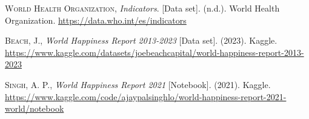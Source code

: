 \documentclass[fleqn,11pt]{article}
\begin{document}
\begin{thebibliography}{10}
 \textsc{World Health Organization}, \textit{Indicators}. [Data set]. (n.d.). World Health Organization. \newline
\small{\url{https://data.who.int/es/indicators}}

 \textsc{Beach, J.}, \textit{World Happiness Report 2013-2023} [Data set]. (2023). Kaggle. \newline
\small{\url{https://www.kaggle.com/datasets/joebeachcapital/world-happiness-report-2013-2023}}

 \textsc{Singh, A. P.}, \textit{World Happiness Report 2021} [Notebook]. (2021). Kaggle. \newline
\small{\url{https://www.kaggle.com/code/ajaypalsinghlo/world-happiness-report-2021-world/notebook}}

\end{thebibliography}
\end{document}
